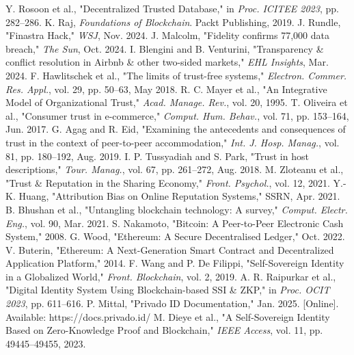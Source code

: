 \documentclass[conference]{IEEEtran}
\begin{document}
\begin{thebibliography}{99}
 Y. Rosoon et al., "Decentralized Trusted Database," in \textit{Proc. ICITEE 2023}, pp. 282–286.
 K. Raj, \textit{Foundations of Blockchain}. Packt Publishing, 2019.
 J. Rundle, "Finastra Hack," \textit{WSJ}, Nov. 2024.
 J. Malcolm, "Fidelity confirms 77,000 data breach," \textit{The Sun}, Oct. 2024.
 I. Blengini and B. Venturini, "Transparency \& conflict resolution in Airbnb \& other two-sided markets," \textit{EHL Insights}, Mar. 2024.
 F. Hawlitschek et al., "The limits of trust-free systems," \textit{Electron. Commer. Res. Appl.}, vol. 29, pp. 50–63, May 2018.
 R. C. Mayer et al., "An Integrative Model of Organizational Trust," \textit{Acad. Manage. Rev.}, vol. 20, 1995.
 T. Oliveira et al., "Consumer trust in e-commerce," \textit{Comput. Hum. Behav.}, vol. 71, pp. 153–164, Jun. 2017.
 G. Agag and R. Eid, "Examining the antecedents and consequences of trust in the context of peer-to-peer accommodation," \textit{Int. J. Hosp. Manag.}, vol. 81, pp. 180–192, Aug. 2019.
 I. P. Tussyadiah and S. Park, "Trust in host descriptions," \textit{Tour. Manag.}, vol. 67, pp. 261–272, Aug. 2018.
 M. Zloteanu et al., "Trust \& Reputation in the Sharing Economy," \textit{Front. Psychol.}, vol. 12, 2021.
 Y.-K. Huang, "Attribution Bias on Online Reputation Systems," SSRN, Apr. 2021.
 B. Bhushan et al., "Untangling blockchain technology: A survey," \textit{Comput. Electr. Eng.}, vol. 90, Mar. 2021.
 S. Nakamoto, "Bitcoin: A Peer-to-Peer Electronic Cash System," 2008.
 G. Wood, "Ethereum: A Secure Decentralised Ledger," Oct. 2022.
 V. Buterin, "Ethereum: A Next-Generation Smart Contract and Decentralized Application Platform," 2014.
 F. Wang and P. De Filippi, "Self-Sovereign Identity in a Globalized World," \textit{Front. Blockchain}, vol. 2, 2019.
 A. R. Raipurkar et al., "Digital Identity System Using Blockchain-based SSI \& ZKP," in \textit{Proc. OCIT 2023}, pp. 611–616.
 P. Mittal, "Privado ID Documentation," Jan. 2025. [Online]. Available: https://docs.privado.id/
 M. Dieye et al., "A Self-Sovereign Identity Based on Zero-Knowledge Proof and Blockchain," \textit{IEEE Access}, vol. 11, pp. 49445–49455, 2023.

\end{thebibliography}
\end{document}

